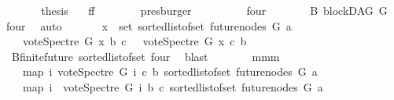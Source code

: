 \begin{isabellebody}
\ \ \ \ \isamarkupfalse%
\ \isamarkupfalse%
\ {\isacharquery}{\kern0pt}thesis\ \isamarkupfalse%
\ \ ff\isanewline
\ \ \ \ \ \ \isamarkupfalse%
\ presburger\ \isanewline
\ \ \isamarkupfalse%
\isanewline
\ \ \ \ \isamarkupfalse%
\ four\isanewline
\ \ \ \ \isamarkupfalse%
\ \isamarkupfalse%
\ B{}{\isacharcolon}{\kern0pt}\ blockDAG\ G\ \isamarkupfalse%
\ four\ \isamarkupfalse%
\ auto\isanewline
\ \ \ \ \isamarkupfalse%
\ {\isachardoublequoteopen}{\isasymforall}\ x\ {\isasymin}\ set\ {\isacharparenleft}{\kern0pt}sorted{\isacharunderscore}{\kern0pt}list{\isacharunderscore}{\kern0pt}of{\isacharunderscore}{\kern0pt}set\ {\isacharparenleft}{\kern0pt}future{\isacharunderscore}{\kern0pt}nodes\ G\ a{\isacharparenright}{\kern0pt}{\isacharparenright}{\kern0pt}{\isachardot}{\kern0pt}\ \isanewline
\ \ \ \ vote{\isacharunderscore}{\kern0pt}Spectre\ G\ x\ b\ c\ {\isacharequal}{\kern0pt}\ {\isacharminus}{\kern0pt}\ vote{\isacharunderscore}{\kern0pt}Spectre\ G\ x\ c\ b{\isachardoublequoteclose}\ \isanewline
\ \ \ \ \ \ \isamarkupfalse%
\ {}{\isacharparenleft}{\kern0pt}{}{\isacharparenright}{\kern0pt}\ B{}{\isachardot}{\kern0pt}finite{\isacharunderscore}{\kern0pt}future\ sorted{\isacharunderscore}{\kern0pt}list{\isacharunderscore}{\kern0pt}of{\isacharunderscore}{\kern0pt}set{\isacharparenleft}{\kern0pt}{}{\isacharparenright}{\kern0pt}\ four\ \isamarkupfalse%
\ blast\isanewline
\ \ \ \ \isamarkupfalse%
\ \isamarkupfalse%
\ mmm{\isacharcolon}{\kern0pt}\ \isanewline
\ \ \ \ {\isachardoublequoteopen}{\isacharparenleft}{\kern0pt}map\ {\isacharparenleft}{\kern0pt}{\isasymlambda}i{\isachardot}{\kern0pt}\ vote{\isacharunderscore}{\kern0pt}Spectre\ G\ i\ c\ b{\isacharparenright}{\kern0pt}\ {\isacharparenleft}{\kern0pt}sorted{\isacharunderscore}{\kern0pt}list{\isacharunderscore}{\kern0pt}of{\isacharunderscore}{\kern0pt}set\ {\isacharparenleft}{\kern0pt}future{\isacharunderscore}{\kern0pt}nodes\ G\ a{\isacharparenright}{\kern0pt}{\isacharparenright}{\kern0pt}{\isacharparenright}{\kern0pt}\ {\isacharequal}{\kern0pt}\isanewline
\ \ \ \ {\isacharparenleft}{\kern0pt}map\ {\isacharparenleft}{\kern0pt}{\isasymlambda}i{\isachardot}{\kern0pt}\ {\isacharminus}{\kern0pt}\ vote{\isacharunderscore}{\kern0pt}Spectre\ G\ i\ b\ c{\isacharparenright}{\kern0pt}\ {\isacharparenleft}{\kern0pt}sorted{\isacharunderscore}{\kern0pt}list{\isacharunderscore}{\kern0pt}of{\isacharunderscore}{\kern0pt}set\ {\isacharparenleft}{\kern0pt}future{\isacharunderscore}{\kern0pt}nodes\ G\ a{\isacharparenright}{\kern0pt}{\isacharparenright}{\kern0pt}{\isacharparenright}{\kern0pt}{\isachardoublequoteclose}\isanewline

\end{isabellebody}
